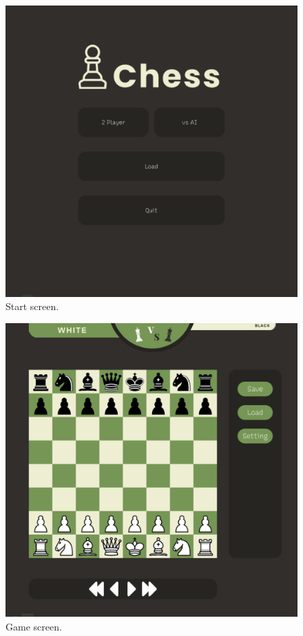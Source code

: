 \documentclass[a4paper, 10pt, titlepage]{report}
\begin{document}
  \begin{figure}%
    \includegraphics[width=\linewidth]{start_screen.png}
    \caption{Start screen.}
    \label{fig:first}
  \end{figure}%
  \hfill

  \begin{figure}%
    \includegraphics[width=\linewidth]{game_screen.png}
    \caption{Game screen.}
    \label{fig:second}
  \end{figure}%
  \hfill \break
  
\end{document}
